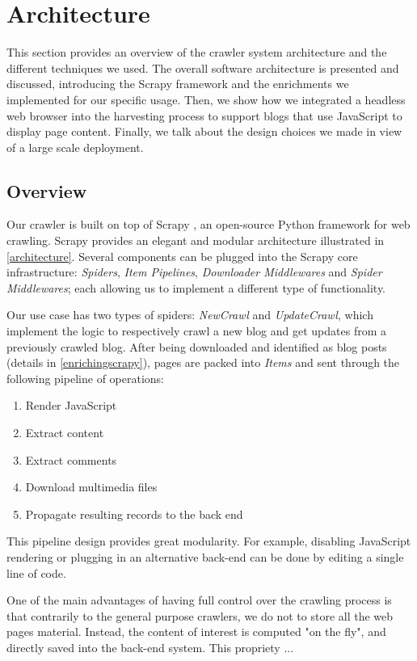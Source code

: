 \section{Architecture}
\label{architecture}

This section provides an overview  of the crawler system architecture and the different techniques we used. The overall software architecture is presented and discussed, introducing the Scrapy framework and the enrichments we implemented for our specific usage. Then, we show how we integrated a headless web browser into the harvesting process to support blogs that use JavaScript to display page content. Finally, we talk about the design choices we made in view of a large scale deployment.

\subsection{Overview}

Our crawler is built on top of Scrapy \cite{scrapy2014}, an open-source Python framework for web crawling. Scrapy provides an elegant and modular architecture illustrated in \autoref{architecture}. Several components can be plugged into the Scrapy core infrastructure: \emph{Spiders}, \emph{Item Pipelines}, \emph{Downloader Middlewares} and \emph{Spider Middlewares}; each allowing us to implement a different type of functionality.

Our use case has two types of spiders: \emph{NewCrawl} and \emph{UpdateCrawl}, which implement the logic to respectively crawl a new blog and get updates from a previously crawled blog. After being downloaded and identified as blog posts (details in \autoref{enrichingscrapy}), pages are packed into \emph{Items} and sent through the following pipeline of operations:
\begin{enumerate}
  \item Render JavaScript
  \item Extract content
  \item Extract comments
  \item Download multimedia files
  \item Propagate resulting records to the back end
\end{enumerate}
This pipeline design provides great modularity. For example, disabling JavaScript rendering or plugging in an alternative back-end can be done by editing a single line of code.

One of the main advantages of having full control over the crawling process is that contrarily to the general purpose crawlers, we do not to store all the web pages material. Instead, the content of interest is computed "on the fly", and directly saved into the back-end system. This propriety ...

